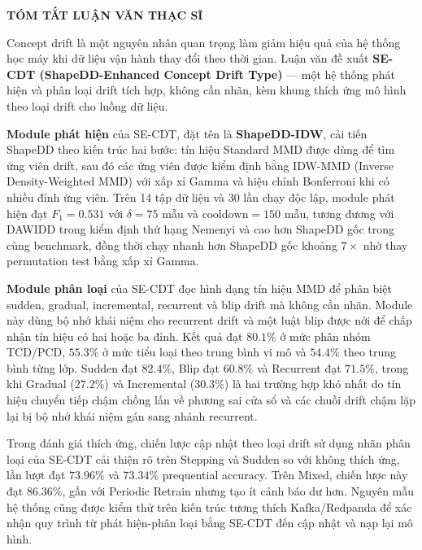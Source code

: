 \newpage

\setcounter{tocdepth}{0}

\begin{center}
    \Large \textbf{TÓM TẮT LUẬN VĂN THẠC SĨ}
\end{center}

Concept drift là một nguyên nhân quan trọng làm giảm hiệu quả của hệ thống học máy khi dữ liệu vận hành thay đổi theo thời gian. Luận văn đề xuất \textbf{SE-CDT (ShapeDD-Enhanced Concept Drift Type)} --- một hệ thống phát hiện và phân loại drift tích hợp, không cần nhãn, kèm khung thích ứng mô hình theo loại drift cho luồng dữ liệu.

\textbf{Module phát hiện} của SE-CDT, đặt tên là \textbf{ShapeDD-IDW}, cải tiến ShapeDD theo kiến trúc hai bước: tín hiệu Standard MMD được dùng để tìm ứng viên drift, sau đó các ứng viên được kiểm định bằng IDW-MMD (Inverse Density-Weighted MMD) với xấp xỉ Gamma và hiệu chỉnh Bonferroni khi có nhiều đỉnh ứng viên. Trên 14 tập dữ liệu và 30 lần chạy độc lập, module phát hiện đạt $F_1 = 0.531$ với $\delta = 75$ mẫu và $\text{cooldown} = 150$ mẫu, tương đương với DAWIDD trong kiểm định thứ hạng Nemenyi và cao hơn ShapeDD gốc trong cùng benchmark, đồng thời chạy nhanh hơn ShapeDD gốc khoảng $7\times$ nhờ thay permutation test bằng xấp xỉ Gamma.

\textbf{Module phân loại} của SE-CDT đọc hình dạng tín hiệu MMD để phân biệt sudden, gradual, incremental, recurrent và blip drift mà không cần nhãn. Module này dùng bộ nhớ khái niệm cho recurrent drift và một luật blip được nới để chấp nhận tín hiệu có hai hoặc ba đỉnh. Kết quả đạt $80.1\%$ ở mức phân nhóm TCD/PCD, $55.3\%$ ở mức tiểu loại theo trung bình vi mô và $54.4\%$ theo trung bình từng lớp. Sudden đạt $82.4\%$, Blip đạt $60.8\%$ và Recurrent đạt $71.5\%$, trong khi Gradual ($27.2\%$) và Incremental ($30.3\%$) là hai trường hợp khó nhất do tín hiệu chuyển tiếp chậm chồng lấn về phương sai cửa sổ và các chuỗi drift chậm lặp lại bị bộ nhớ khái niệm gán sang nhánh recurrent.

Trong đánh giá thích ứng, chiến lược cập nhật theo loại drift sử dụng nhãn phân loại của SE-CDT cải thiện rõ trên Stepping và Sudden so với không thích ứng, lần lượt đạt $73.96\%$ và $73.34\%$ prequential accuracy. Trên Mixed, chiến lược này đạt $86.36\%$, gần với Periodic Retrain nhưng tạo ít cảnh báo dư hơn. Nguyên mẫu hệ thống cũng được kiểm thử trên kiến trúc tương thích Kafka/Redpanda để xác nhận quy trình từ phát hiện-phân loại bằng SE-CDT đến cập nhật và nạp lại mô hình.

